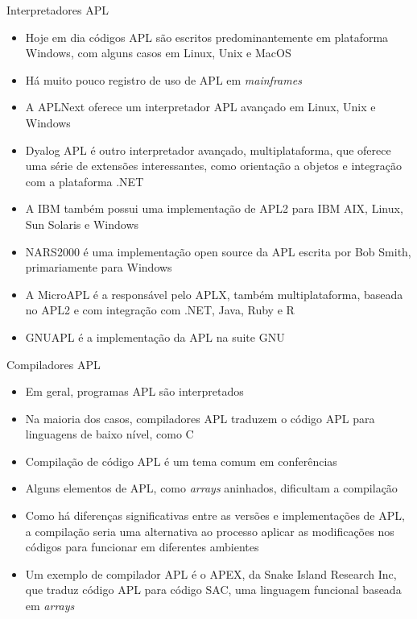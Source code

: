 \begin{frame}[fragile]{Interpretadores APL}

    \begin{itemize}
        \item Hoje em dia códigos APL são escritos predominantemente em plataforma Windows, com alguns casos em Linux, Unix e MacOS

        \item Há muito pouco registro de uso de APL em \textit{mainframes}

        \item A APLNext oferece um interpretador APL avançado em Linux, Unix e Windows

        \item Dyalog APL é outro interpretador avançado, multiplataforma, que oferece uma série de extensões interessantes, como orientação a objetos e integração com a plataforma .NET

        \item A IBM também possui uma implementação de APL2 para IBM AIX, Linux, Sun Solaris e Windows

        \item NARS2000 é uma implementação open source da APL escrita por Bob Smith, primariamente para Windows

        \item A MicroAPL é a responsável pelo APLX, também multiplataforma, baseada no APL2 e com integração com .NET, Java, Ruby e R

        \item GNUAPL é a implementação da APL na suite GNU
    \end{itemize}

\end{frame}

\begin{frame}[fragile]{Compiladores APL}

    \begin{itemize}
        \item Em geral, programas APL são interpretados

        \item Na maioria dos casos, compiladores APL traduzem o código APL para linguagens de baixo nível, como C
        \item Compilação de código APL é um tema comum em conferências

        \item Alguns elementos de APL, como \textit{arrays} aninhados, dificultam a compilação

        \item Como há diferenças significativas entre as versões e implementações de APL, a compilação seria uma alternativa ao processo aplicar as modificações nos códigos para funcionar em diferentes ambientes

        \item Um exemplo de compilador APL é o APEX, da Snake Island Research Inc, que traduz código APL para código SAC, uma linguagem funcional baseada em \textit{arrays}
    \end{itemize}

\end{frame}
